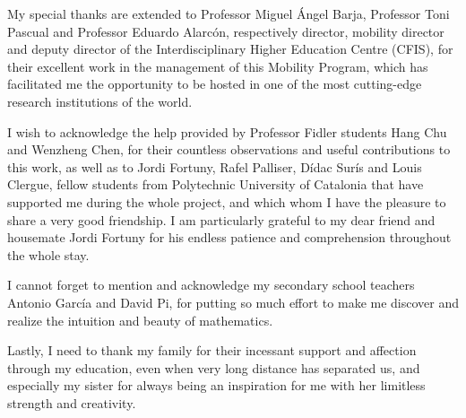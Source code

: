 My special thanks are extended to Professor Miguel Ángel Barja, Professor Toni
Pascual and Professor Eduardo Alarcón, respectively director, mobility director
and deputy director of the Interdisciplinary Higher Education Centre (CFIS), for
their excellent work in the management of this Mobility Program, which has
facilitated me the opportunity to be hosted in one of the most cutting-edge
research institutions of the world.

I wish to acknowledge the help provided by Professor Fidler students Hang Chu
and Wenzheng Chen, for their countless observations and useful contributions to
this work, as well as to Jordi Fortuny, Rafel Palliser, Dídac Surís and Louis
Clergue, fellow students from Polytechnic University of Catalonia that have
supported me during the whole project, and which whom I have the pleasure to
share a very good friendship. I am particularly grateful to my dear friend and
housemate Jordi Fortuny for his endless patience and comprehension throughout
the whole stay.

I cannot forget to mention and acknowledge my secondary school teachers Antonio
García and David Pi, for putting so much effort to make me discover and realize
the intuition and beauty of mathematics.

Lastly, I need to thank my family for their incessant support and affection
through my education, even when very long distance has separated us, and
especially my sister for always being an inspiration for me with her limitless
strength and creativity.


\tableofcontents
\listoftables
\listoffigures
\printglossaries

